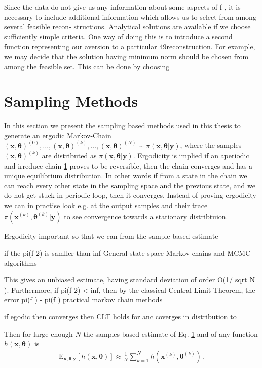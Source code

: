Since the data do not give us any information about some aspects of f , it is necessary to
include additional information which allows us to select from among several feasible recon-
structions. Analytical solutions are available if we choose sufficiently simple criteria. One way
of doing this is to introduce a second function representing our aversion to a particular
49reconstruction. For example, we may decide that the solution having minimum norm should
be chosen from among the feasible set. This can be done by choosing



\section{Sampling Methods}
In this section we present the sampling based methods used in this thesis to generate an ergodic Markov-Chain $ (\bm{x}, \bm{\theta} )^{(0)}, \dots, (\bm{x}, \bm{\theta} )^{(k)} , \dots,  (\bm{x}, \bm{\theta})^{(N)} \sim \pi(\bm{x},\bm{\theta}| \bm{y}) $, where the samples $(\bm{x}, \bm{\theta} )^{(k)}$ are distributed as $\pi(\bm{x},\bm{\theta}| \bm{y}) $.
Ergodicity is implied if an aperiodic and irreduce chain \ref{} proves to be reversible, then the chain converges and has a unique  equilibrium distribution.
In other words if from a state in the chain we can reach every other state in the sampling space and the previous state, and we do not get stuck in periodic loop, then it converges.
Instead of proving ergodicity we can in practise look e.g. at the output samples and their trace $\pi(\bm{x}^{(k)},\bm{\theta}^{(k)}| \bm{y})$ to see convergence towards a stationary distribtuion.


Ergodicity important so that we can from the sample based estimate

if the pi(f 2) is samller than inf
General state space Markov chains and
MCMC algorithms

This gives an unbiased estimate, having standard deviation of order O(1/ sqrt N ).
Furthermore, if pi(f 2) < inf, then by the classical Central Limit Theorem, the
error pi(f ) - pi(f ) 
practical markov chain methods

if egodic then converges
then CLT holds for
anc coverges in distribution to


Then for large enough $N$ the samples based estimate of Eq. \ref{} and of any function $h(\bm{x}, \bm{\theta})$ is
\begin{align}
	\label{eq:sampMean}
	\text{E}_{\bm{x},\bm{\theta}|\bm{y}} [h(\bm{x}, \bm{\theta})] \approx \frac{1}{N} \sum_{k=1}^{N} h(\bm{x}^{(k)},\bm{\theta}^{(k)}) \, .
\end{align}

